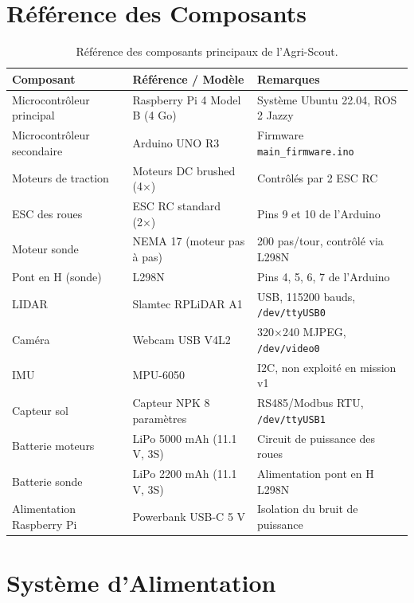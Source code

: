 \documentclass [12pt, a4paper]{article}
\begin{document}
\section{Référence des Composants}

\begin{table}[H]
\centering
\begin{tabularx}{\textwidth}{llX}
\toprule
\textbf{Composant} & \textbf{Référence / Modèle} & \textbf{Remarques} \\
\midrule
Microcontrôleur principal & Raspberry Pi 4 Model B (4 Go) & Système Ubuntu 22.04, ROS 2 Jazzy \\
Microcontrôleur secondaire & Arduino UNO R3 & Firmware \texttt{main\_firmware.ino} \\
Moteurs de traction & Moteurs DC brushed (4×) & Contrôlés par 2 ESC RC \\
ESC des roues & ESC RC standard (2×) & Pins 9 et 10 de l'Arduino \\
Moteur sonde & NEMA 17 (moteur pas à pas) & 200 pas/tour, contrôlé via L298N \\
Pont en H (sonde) & L298N & Pins 4, 5, 6, 7 de l'Arduino \\
LIDAR & Slamtec RPLiDAR A1 & USB, 115200 bauds, \texttt{/dev/ttyUSB0} \\
Caméra & Webcam USB V4L2 & 320×240 MJPEG, \texttt{/dev/video0} \\
IMU & MPU-6050 & I2C, non exploité en mission v1 \\
Capteur sol & Capteur NPK 8 paramètres & RS485/Modbus RTU, \texttt{/dev/ttyUSB1} \\
Batterie moteurs & LiPo 5000 mAh (11.1 V, 3S) & Circuit de puissance des roues \\
Batterie sonde & LiPo 2200 mAh (11.1 V, 3S) & Alimentation pont en H L298N \\
Alimentation Raspberry Pi & Powerbank USB-C 5 V & Isolation du bruit de puissance \\
\bottomrule
\end{tabularx}
\caption{Référence des composants principaux de l'Agri-Scout.}
\label{tab:composants}
\end{table}

\section{Système d'Alimentation}
\end{document}
